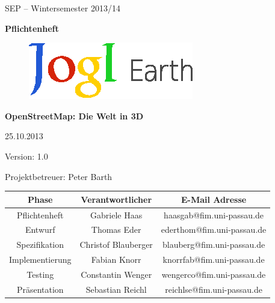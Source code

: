\documentclass[10pt]{scrreprt}
\begin{document}
\begin{center}
\vspace{2.0 cm}
{\LARGE SEP – Wintersemester 2013/14}

\vspace{1.0 cm}
\textbf{{\Huge Pflichtenheft}}

\vspace{0.8 cm}
\begin{figure}[!htb]
\begin{center}
	\includegraphics[scale=1.5]{Logo-Print.eps}
\end{center}
\end{figure}

\vspace{0.2 cm}
\textbf{{\huge OpenStreetMap: Die Welt in 3D}}

\vspace{1.5 cm}
25.10.2013

\vspace{0.5 cm}
Version: 1.0

\vspace{1.5 cm}
{\Large Projektbetreuer: Peter Barth}

\vspace{1.5 cm}
\begin{tabular}{|c|c|c|}
\hline 
\rule[-1ex]{0pt}{4ex} \textbf{Phase} & \textbf{Verantwortlicher} & \textbf{E-Mail Adresse} \\ 
\hline  \hline
\rule[-1ex]{0pt}{4ex} Pflichtenheft & Gabriele Haas & haasgab@fim.uni-passau.de \\ 
\hline  \hline
\rule[-1ex]{0pt}{4ex} Entwurf & Thomas Eder & ederthom@fim.uni-passau.de \\ 
\hline  \hline
\rule[-1ex]{0pt}{4ex} Spezifikation & Christof Blauberger & blauberg@fim.uni-passau.de \\ 
\hline  \hline
\rule[-1ex]{0pt}{4ex} Implementierung & Fabian Knorr & knorrfab@fim.uni-passau.de \\ 
\hline \hline 
\rule[-1ex]{0pt}{4ex} Testing & Constantin Wenger & wengerco@fim.uni-passau.de \\ 
\hline  \hline
\rule[-1ex]{0pt}{4ex} Präsentation & Sebastian Reichl & reichlse@fim.uni-passau.de \\ 
\hline 
\end{tabular}

\end{center}
\end{document}
